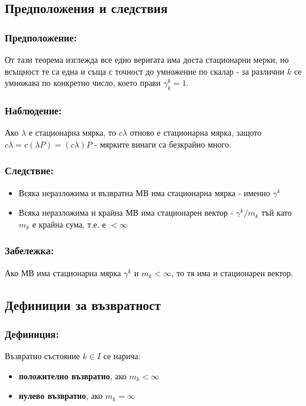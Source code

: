 \documentclass{article}
\begin{document}
\subsection{Предположения и следствия}
\subsubsection*{Предположение:}
От тази теорема изглежда все едно веригата има доста стационарни мерки, но всъщност 
те са една и съща с точност до умножение по скалар - за различни $k$ се умножава по конкретно число, 
което прави $\gamma_k^k = 1$.

\subsubsection*{Наблюдение:}
Ако $\lambda$ е стационарна мярка, то $c\lambda$ отново е стационарна мярка, защото 
$c\lambda = c(\lambda P) = (c\lambda)P$ - мярките винаги са безкрайно много.

\subsubsection*{Следствие:}
\begin{itemize}
\item Всяка неразложима и възвратна МВ има стационарна мярка - именно $\gamma^k$
\item Всяка неразложима и крайна МВ има стационарен вектор - $\gamma^k/m_k$ тъй като $m_k$ е крайна сума, т.е. е $< \infty$
\end{itemize}

\subsubsection*{Забележка:}
Ако МВ има стационарна мярка $\gamma^k$ и $m_k < \infty$, то тя има и стационарен вектор.

\subsection{Дефиниции за възвратност}
\subsubsection*{Дефиниция:}
Възвратно състояние $k \in I$ се нарича:
\begin{itemize}
\item \textbf{положително възвратно}, ако $m_k < \infty$
\item \textbf{нулево възвратно}, ако $m_k = \infty$
\end{itemize}
\end{document}

